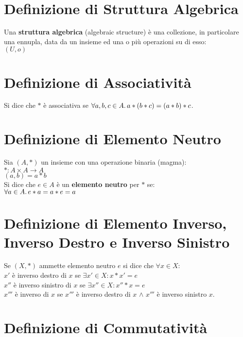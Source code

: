\documentclass[a4paper, twoside, italian, 11pt]{book}
\begin{document}
\section{Definizione di Struttura Algebrica}

Una \textbf{struttura algebrica} (algebraic structure) è una collezione, in particolare una ennupla, data da un insieme ed una o più operazioni su di esso: \\

$(U, o)$


\section{Definizione di Associatività}

Si dice che $*$ è associativa se $\forall a,b,c \in A \ldotp a * (b * c) = (a * b) * c$.


\section{Definizione di Elemento Neutro}

Sia $(A, *)$ un insieme con una operazione binaria (magma): \\

$* : A \times A \rightarrow A$ \\
\indent
$(a, b) = a * b$ \\

\noindent
Si dice che $e \in A$ è un \textbf{elemento neutro} per $*$ se: \\

$\forall a \in A \ldotp e * a = a * e = a$


\section{Definizione di Elemento Inverso, Inverso Destro e Inverso Sinistro}

Se $(X, *)$ ammette elemento neutro $e$ si dice che $\forall x \in X$: \\

$x'$ è inverso destro di $x$ se $\exists x' \in X : x * x' = e$ \\
\indent
$x''$ è inverso sinistro di $x$ se $\exists x'' \in X : x'' * x = e$ \\
\indent
$x'''$ è inverso di $x$ se $x'''$ è inverso destro di $x$ $\land$ $x'''$ è inverso sinistro $x$.


\section{Definizione di Commutatività}
\end{document}
